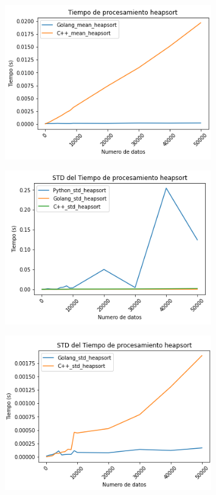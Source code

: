 \documentclass{article}
\begin{document}
\begin{enumerate}
\begin{figure}[H]
\centering
\includegraphics[width=0.8\textwidth]{Imagen/GHS2.png}
\label{fig:QuickSort}
\end{figure}

\begin{figure}[H]
\centering
\includegraphics[width=0.8\textwidth]{Imagen/GHS3.png}
\label{fig:QuickSort}
\end{figure}

\begin{figure}[H]
\centering
\includegraphics[width=0.8\textwidth]{Imagen/GHS4.png}
\label{fig:QuickSort}
\end{figure}


\end{enumerate}
\end{document}
